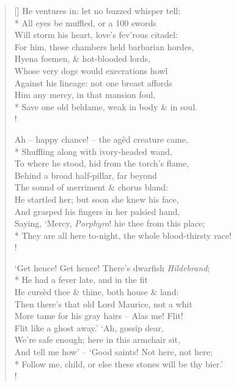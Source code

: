 \documentclass[MAIN]{subfiles}
\begin{document}
\begin{verse}[\versewidth]
\vin He ventures in: let no buzzed whisper tell:\\*
\vin All eyes be muffled, or a 100 swords\\
\vin Will storm his heart, love's fev'rous citadel:\\
\vin For him, those chambers held barbarian hordes,\\
\vin Hyena foemen, \& hot-blooded lords,\\
\vin Whose very dogs would execrations howl\\
\vin Against his lineage: not one breast affords\\
\vin Him any mercy, in that mansion foul,\\*
Save one old beldame, weak in body \& in soul.\\!

\vin Ah -- happy chance! -- the ag\`ed creature came,\\*
\vin Shuffling along with ivory-headed wand,\\
\vin To where he stood, hid from the torch's flame,\\
\vin Behind a broad half-pillar, far beyond\\
\vin The sound of merriment \& chorus bland:\\
\vin He startled her; but soon she knew his face,\\
\vin And grasped his fingers in her palsied hand,\\
\vin Saying, `Mercy, \emph{Porphyro}! hie thee from this place;\\*
They are all here to-night, the whole blood-thirsty race!\\!

\vin `Get hence! Get hence! There's dwarfish \emph{Hildebrand};\\*
\vin He had a fever late, and in the fit\\
\vin He curs\`ed thee \& thine, both house \& land:\\
\vin Then there's that old Lord Maurice, not a whit\\
\vin More tame for his gray hairs -- Alas me! Flit!\\
\vin Flit like a ghost away.' `Ah, gossip dear,\\
\vin We're safe enough; here in this armchair sit,\\
\vin And tell me how' -- `Good saints! Not here, not here;\\*
Follow me, child, or else these stones will be thy bier.'\\!


\end{verse}
\end{document}
